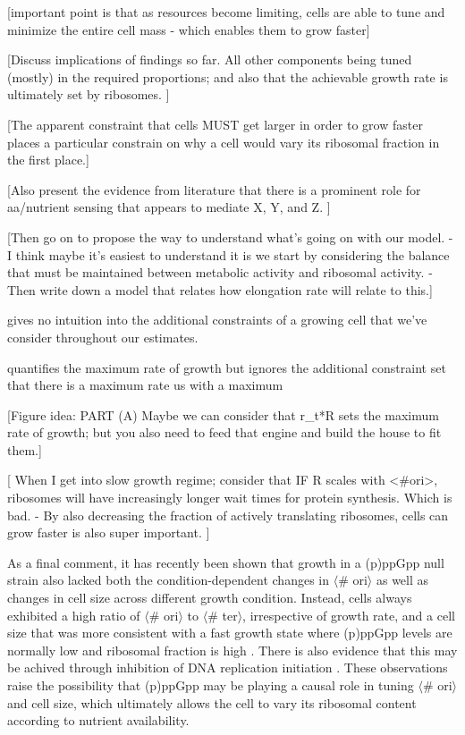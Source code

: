 [important point is that as resources become limiting, cells are able to tune and minimize
the entire cell mass - which enables them to grow faster]

[Discuss implications of findings so far. All other components being tuned (mostly) in the required proportions; and also that the achievable growth rate is ultimately set by ribosomes. ]

[The apparent constraint that cells MUST get larger in order to grow faster places a particular constrain on why a cell would vary its ribosomal fraction in the first place.]

[Also present the evidence from literature that there is a prominent role for aa/nutrient sensing that appears to mediate X, Y, and Z. ]

[Then go on to propose the way to understand what’s going on with our model.
    - I think maybe it’s easiest to understand it is we start by considering the balance that must be maintained between metabolic activity and ribosomal activity.
    - Then write down a model that relates how elongation rate will relate to this.]



gives no intuition into the additional constraints of a growing
cell that we've consider throughout our estimates.



quantifies the maximum rate of growth but ignores the additional constraint set  that there is a maximum rate us with a maximum

[Figure idea: PART (A) Maybe we can consider that r_t*R sets the maximum rate of growth; but you also need to feed that engine and build the house to fit them.]

[ When I get into slow growth regime; consider that IF R scales with <#ori>, ribosomes will have increasingly longer wait times for protein synthesis. Which is bad.
    - By also decreasing the fraction of actively translating ribosomes, cells can grow faster is also super important. ]




As a final comment, it has recently been shown that growth in a (p)ppGpp null
strain also lacked both the condition-dependent changes in $\langle$\#
ori$\rangle$ as well as changes in cell size across different growth condition.
Instead, cells always exhibited a high ratio of $\langle$\# ori$\rangle$ to
$\langle$\# ter$\rangle$, irrespective of growth rate, and a cell size that was
more consistent with a fast growth state where (p)ppGpp levels are normally low
\citep{fernandezcoll2020} and ribosomal fraction is high \citep{zhu2019}. There
is also evidence that this may be achived through inhibition of DNA replication
initiation \citep{kraemer2019}. These observations raise the possibility that
(p)ppGpp may be playing a causal role in tuning $\langle$\# ori$\rangle$ and
cell size, which ultimately allows the cell to vary its ribosomal content
according to nutrient availability.
